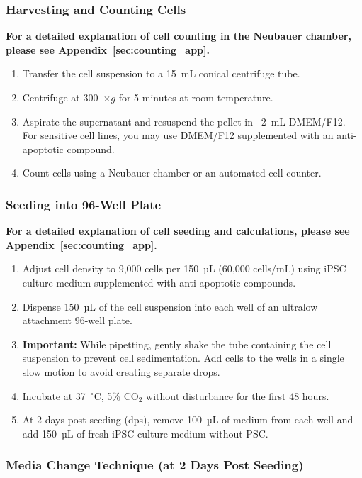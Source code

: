 \documentclass[11pt]{article}
\begin{document}
\subsubsection{Harvesting and Counting Cells}
\textbf {For a detailed explanation of cell counting in the Neubauer chamber, please see Appendix~\ref{sec:counting_app}.}
\begin{enumerate}[leftmargin=*]
    \item Transfer the cell suspension to a 15~mL conical centrifuge tube.
    \item Centrifuge at 300~$\times g$ for 5 minutes at room temperature.
    \item Aspirate the supernatant and resuspend the pellet in ~2~mL DMEM/F12. For sensitive cell lines, you may use DMEM/F12 supplemented with an anti-apoptotic compound.
    \item Count cells using a Neubauer chamber or an automated cell counter.
\end{enumerate}

\subsubsection{Seeding into 96-Well Plate}
\textbf {For a detailed explanation of cell seeding and calculations, please see Appendix~\ref{sec:counting_app}.}
\begin{enumerate}[leftmargin=*]
    \item Adjust cell density to 9,000 cells per 150~µL (60,000 cells/mL) using iPSC culture medium supplemented with anti-apoptotic compounds.
    \item Dispense 150~µL of the cell suspension into each well of an ultralow attachment 96-well plate.
    \item \textbf{Important:} While pipetting, gently shake the tube containing the cell suspension to prevent cell sedimentation. Add cells to the wells in a single slow motion to avoid creating separate drops.
    \item Incubate at 37~$^\circ$C, 5\% CO$_2$ without disturbance for the first 48 hours.
    \item At 2 days post seeding (dps), remove 100~µL of medium from each well and add 150~µL of fresh iPSC culture medium without PSC.
\end{enumerate}

\subsubsection{Media Change Technique (at 2 Days Post Seeding)}
\end{document}
